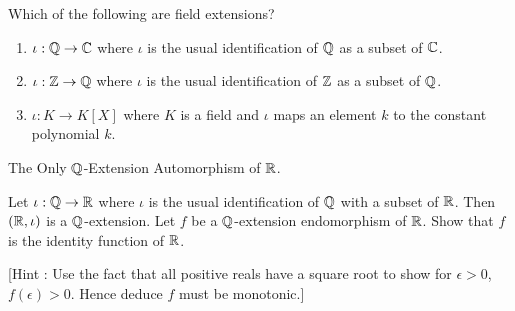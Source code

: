 \documentclass[../book.tex]{subfiles}
\begin{document}
\begin{ex} 
    
    Which of the following are field extensions? 
    \begin{enumerate}
        \item $\iota : \mathbb{Q} \to \mathbb{C}$ where $\iota$ is 
        the usual identification of $\mathbb{Q}$ as a subset of $\mathbb{C}$. 
        \item $\iota : \mathbb{Z} \to \mathbb{Q}$ where $\iota$ is
        the usual identification of $\mathbb{Z}$ as a subset of $\mathbb{Q}$.
        \item $\iota : K \to K[X]$ where $K$ is a field and
        $\iota$ maps an element $k$ to the constant polynomial $k$. 
    \end{enumerate}
    
\end{ex}
\begin{ex} The Only $\mathbb{Q}$-Extension Automorphism of $\mathbb{R}$.
    
    Let $\iota : \mathbb{Q} \to \mathbb{R}$ where $\iota$ is the usual identification of
    $\mathbb{Q}$ with a subset of $\mathbb{R}$.
    Then $(\mathbb{R},\iota)$ is a $\mathbb{Q}$-extension.
    Let $f$ be a $\mathbb{Q}$-extension endomorphism of $\mathbb{R}$. 
    Show that $f$ is the identity function of $\mathbb{R}$.
    
    [Hint : Use the fact that all positive reals have a square root
    to show for $\epsilon > 0$, $f(\epsilon) > 0$.
    Hence deduce $f$ must be monotonic.]
\end{ex}



\end{document}
